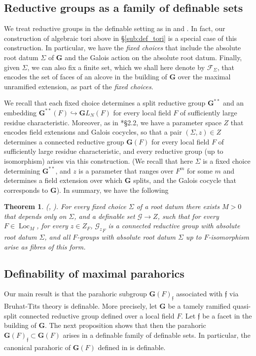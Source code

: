 \documentclass{amsart}
\newcommand{\cF}{\mathcal{F}}
\newcommand{\loc}{\operatorname{Loc}}
\newcommand{\bG}{\mathbf{G}}
\newcommand{\cG}{\mathcal{G}}
\newcommand{\ff}{{\mathfrak f}}
\theoremstyle{plain}
\newtheorem{theorem}[thm]{Theorem}
\theoremstyle{definition}
\begin{document}
\subsection{Reductive groups as a family of definable sets}
We treat reductive groups in the definable setting as in \cite{hales:transfert} and \cite{CGH-2}.
In fact, our construction of algebraic tori above in \S \ref{sub:def_tori} is a special case of this construction. 
In particular, we have the \emph{fixed choices} that include the absolute root datum $\Sigma$ of $\bG$ %
and  the Galois action on the absolute root datum. Finally, given $\Sigma$, we can also fix  a finite set, which we shall here denote by 
$\cF_\Sigma$, that encodes the set of faces of an alcove in the building of $\bG$ over the maximal unramified extension, as part of the \emph{fixed choices}.

We recall that each  fixed choice determines  a split reductive group $\bG^{\ast\ast}$ and an embedding 
$\bG^{\ast\ast}(F)\hookrightarrow {\mathbf GL}_N(F)$ for every local field $F$ of sufficiently large residue characteristic.  
Moreover, as in \cite{hales:transfert}*{\S 2.2}, we  have a parameter space $Z$ that encodes field extensions and Galois cocycles, so that a pair 
$(\Sigma, z)\in Z$ determines a connected reductive group $\bG(F)$ for every local field $F$ of sufficiently large residue characteristic, and every reductive group (up to isomorphism)  arises via this construction. 
(We recall that here $\Sigma$ is a fixed choice determining $\bG^{\ast\ast}$, and $z$ is a parameter that ranges over $F^m$ for some $m$ and determines a field extension over which $\bG$ splits, and the Galois cocycle that corresponds to $\bG$). 
In summary, we have the following 
\begin{theorem}\label{thm:def_groups}(\cite{hales:transfert}, \cite{CGH-2}). 
 For every fixed choice $\Sigma$ of a root datum there exists $M>0$ that depends only on 
$\Sigma$, and a  definable set $\cG \to Z$, such that 
for every $F\in \loc_M$, for every $z\in Z_F$, ${\cG_z}_F$ is a connected reductive group with absolute root datum $\Sigma$, and all $F$-groups with absolute root datum $\Sigma$ up to $F$-isomorphism arise as fibres of this form.  
\end{theorem}


\subsection{Definability of maximal parahorics} 
Our main result is that 
the parahoric subgroup $\bG(F)_\ff$ associated with $\ff$ via Bruhat-Tits theory is definable.  
More precisely, let $\bG$ be a tamely ramified quasi-split connected reductive group defined over a local field $F$. Let $\ff$ be a facet in the building of $\bG$.  The next proposition shows that
then the parahoric $\bG(F)_\ff\subset \bG(F)$ arises in a definable family of definable sets. 
In particular, the canonical parahoric of $\bG(F)$ defined in \cite{gross:motive} is definable. 
\end{document}
